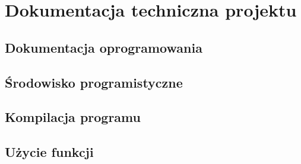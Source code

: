 \section{Dokumentacja techniczna projektu}
\subsection{Dokumentacja oprogramowania}
\subsection{Środowisko programistyczne}
\subsection{Kompilacja programu}
\subsection{Użycie funkcji}
